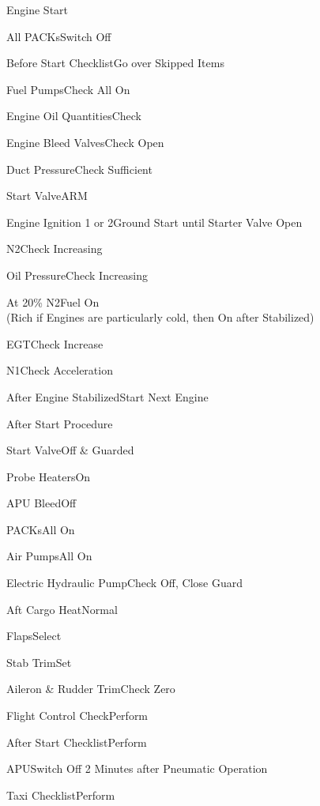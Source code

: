 \documentclass[sim-use]{checklist}
\begin{document}
\begin{checklist}{Engine Start}
	\item{All PACKs}{Switch Off}
	\item{Before Start Checklist}{Go over Skipped Items}
	\item{Fuel Pumps}{Check All On}
	\item{Engine Oil Quantities}{Check}
	\item{Engine Bleed Valves}{Check Open}
	\item{Duct Pressure}{Check Sufficient}
	\item{Start Valve}{ARM}
	 {
		\item{Engine Ignition 1 or 2}{Ground Start until Starter Valve Open}
		\item{N2}{Check Increasing}
		\item{Oil Pressure}{Check Increasing}
		\item{At 20\% N2}{Fuel On\\(Rich if Engines are particularly cold, then On after Stabilized)}
		\item{EGT}{Check Increase}
		\item{N1}{Check Acceleration}
		\item{After Engine Stabilized}{Start Next Engine}
	}
\end{checklist}

\begin{checklist}{After Start Procedure}
	\item{Start Valve}{Off \& Guarded}
	\item{Probe Heaters}{On}
	\item{APU Bleed}{Off}
	\item{PACKs}{All On}
	\item{Air Pumps}{All On}
	\item{Electric Hydraulic Pump}{Check Off, Close Guard}
	\item{Aft Cargo Heat}{Normal}
	\item{Flaps}{Select}
	\item{Stab Trim}{Set}
	\item{Aileron \& Rudder Trim}{Check Zero}
	\item{Flight Control Check}{Perform}
	\item{After Start Checklist}{Perform}
	\item{APU}{Switch Off 2 Minutes after Pneumatic Operation}
	\item{Taxi Checklist}{Perform}
\end{checklist}
\end{document}
